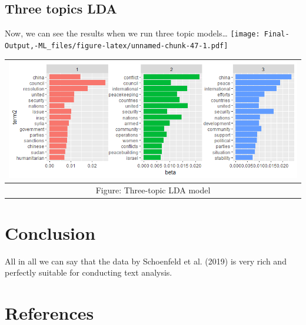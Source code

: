 \documentclass[
]{article}
\begin{document}
\hypertarget{three-topics-lda}{%
\subsection{Three topics LDA}\label{three-topics-lda}}

Now, we can see the results when we run three topic models\ldots{}
\texttt{[image: Final-Output,-ML\_files/figure-latex/unnamed-chunk-47-1.pdf]}

\begin{longtable}[]{@{}c@{}}
\toprule
\includegraphics{Images/three topics.png} \\
\midrule
\endhead
Figure: Three-topic LDA model \\
\bottomrule
\end{longtable}

\hypertarget{conclusion}{%
\section{Conclusion}\label{conclusion}}

All in all we can say that the data by Schoenfeld et al. (2019) is very
rich and perfectly suitable for conducting text analysis.

\newpage

\hypertarget{references}{%
\section*{References}\label{references}}
\end{document}
